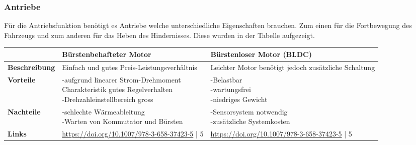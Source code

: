 \subsubsection{Antriebe}

Für die Antriebsfunktion benötigt es Antriebe welche unterschiedliche Eigenschaften brauchen. Zum einen für die Fortbewegung des Fahrzeugs und zum anderen für das Heben des Hindernisses. Diese wurden in der Tabelle aufgezeigt.

\begin{table}[H]
\centering
\small
\begin{tabularx}{\textwidth}{|l|X|X|}
\hline
  \textbf{} & \textbf{Bürstenbehafteter Motor} & \textbf{Bürstenloser Motor (BLDC)}\\
  \hline
  \textbf{Beschreibung}  & Einfach und gutes Preis-Leistungsverhältnis & Leichter Motor benötigt jedoch zusätzliche Schaltung\\
  \hline
  \textbf{Vorteile}  & \makecell{-aufgrund linearer Strom-Drehmoment \\Charakteristik gutes Regelverhalten\\-Drehzahleinstellbereich gross} & \makecell{-Belastbar\\-wartungsfrei\\-niedriges Gewicht}\\
  \hline
  \textbf{Nachteile} & \makecell{-schlechte Wärmeableitung\\-Warten von Kommutator und Bürsten}& \makecell{-Sensorsystem notwendig\\-zusätzliche Systemkosten}\\
  \hline
  \textbf{Links} & \url{https://doi.org/10.1007/978-3-658-37423-5} | 5 & \url{https://doi.org/10.1007/978-3-658-37423-5} | 5 \\
  \hline
\end{tabularx}



\end{table}
